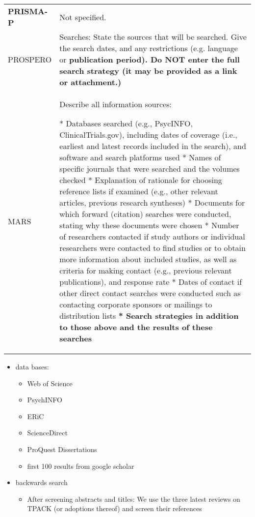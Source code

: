 \documentclass[
]{article}
\providecommand{\tightlist}{%
  \setlength{\itemsep}{0pt}\setlength{\parskip}{0pt}}
\begin{document}
\hypertarget{soslar}{}
\begin{collapse}

\begin{table}[H]
\centering
\begin{tabular}{>{}l|l}
\hline
\cellcolor[HTML]{ececec}{source} & \cellcolor[HTML]{ececec}{description}\\
\hline
\textbf{PRISMA-P} & Not specified.\\
\hline
PROSPERO & Searches: State the sources that will be searched. Give the search dates, and any restrictions (e.g. language or
\textbf{publication period). Do NOT enter the full search strategy (it may be provided as a link or attachment.)}\\
\hline
MARS & Describe all information sources:

* Databases searched (e.g., PsycINFO, ClinicalTrials.gov), including dates of coverage (i.e., earliest and latest records included in the search), and software and search platforms used
* Names of specific journals that were searched and the volumes checked
* Explanation of rationale for choosing reference lists if examined (e.g., other relevant articles, previous research
syntheses)
* Documents for which forward (citation) searches were conducted, stating why these documents were chosen
* Number of researchers contacted if study authors or individual researchers were contacted to find studies or to obtain more information about included studies, as well as criteria for making contact (e.g., previous relevant publications), and response rate
* Dates of contact if other direct contact searches were conducted such as contacting corporate sponsors or mailings to distribution lists
\textbf{* Search strategies in addition to those above and the results of these searches}\\
\hline
\end{tabular}
\end{table}

\end{collapse}

\begin{itemize}
\tightlist
\item
  data bases:

  \begin{itemize}
  \tightlist
  \item
    Web of Science
  \item
    PsychINFO
  \item
    ERiC
  \item
    ScienceDirect
  \item
    ProQuest Dissertations
  \item
    first 100 results from google scholar
  \end{itemize}
\item
  backwards search

  \begin{itemize}
  \tightlist
  \item
    After screening abstracts and titles: We use the three latest
    reviews on TPACK (or adoptions thereof) and screen their references
  \end{itemize}
\end{itemize}
\end{document}
